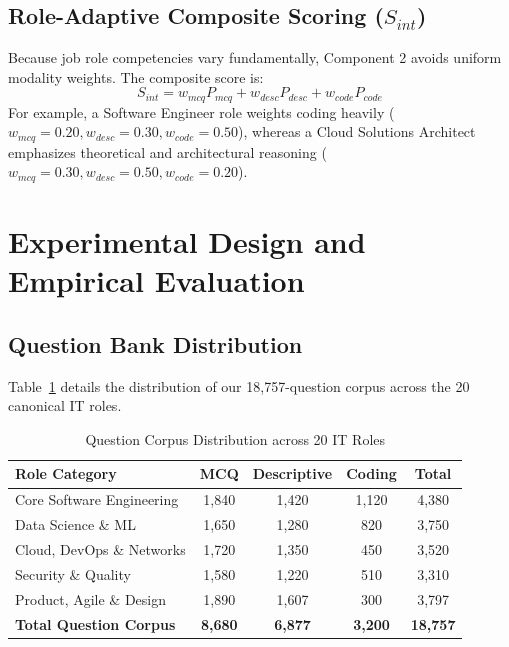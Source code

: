 \documentclass[conference]{IEEEtran}
\begin{document}
\subsection{Role-Adaptive Composite Scoring ($S_{int}$)}
Because job role competencies vary fundamentally, Component 2 avoids uniform modality weights. The composite score is:
\begin{equation}
S_{int} = w_{mcq} P_{mcq} + w_{desc} P_{desc} + w_{code} P_{code}
\end{equation}
For example, a Software Engineer role weights coding heavily ($w_{mcq}=0.20, w_{desc}=0.30, w_{code}=0.50$), whereas a Cloud Solutions Architect emphasizes theoretical and architectural reasoning ($w_{mcq}=0.30, w_{desc}=0.50, w_{code}=0.20$).

\section{Experimental Design and Empirical Evaluation}
\subsection{Question Bank Distribution}
Table~\ref{tab:c2_qbank} details the distribution of our 18,757-question corpus across the 20 canonical IT roles.

\begin{table}[h]
\centering
\caption{Question Corpus Distribution across 20 IT Roles}
\label{tab:c2_qbank}
\begin{tabular}{@{}lcccc@{}}
\toprule
\textbf{Role Category} & \textbf{MCQ} & \textbf{Descriptive} & \textbf{Coding} & \textbf{Total} \\
\midrule
Core Software Engineering & 1,840 & 1,420 & 1,120 & 4,380 \\
Data Science \& ML & 1,650 & 1,280 & 820 & 3,750 \\
Cloud, DevOps \& Networks & 1,720 & 1,350 & 450 & 3,520 \\
Security \& Quality & 1,580 & 1,220 & 510 & 3,310 \\
Product, Agile \& Design & 1,890 & 1,607 & 300 & 3,797 \\
\midrule
\textbf{Total Question Corpus} & \textbf{8,680} & \textbf{6,877} & \textbf{3,200} & \textbf{18,757} \\
\bottomrule
\end{tabular}
\end{table}
\end{document}

